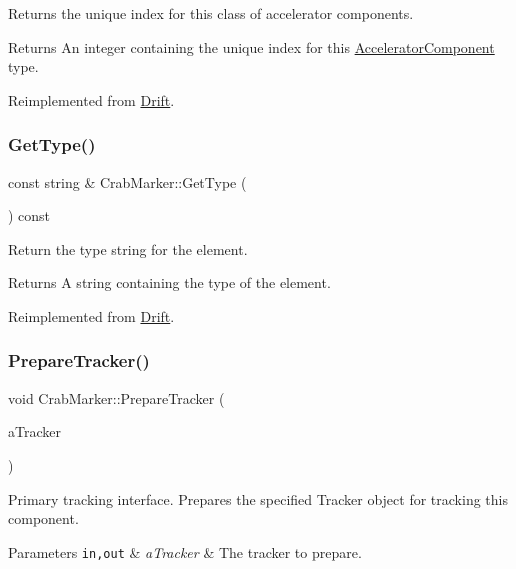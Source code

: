 Returns the unique index for this class of accelerator components. \begin{DoxyReturn}{Returns}
An integer containing the unique index for this \hyperlink{classAcceleratorComponent}{Accelerator\+Component} type. 
\end{DoxyReturn}


Reimplemented from \hyperlink{classDrift_a19bc19d48348912f8693e3ebbf9e92f2}{Drift}.

\mbox{\label{classCrabMarker_a45ab65449808d5072eb033858c2d961a}} 
\subsubsection{\texorpdfstring{Get\+Type()}{GetType()}}
{\footnotesize\ttfamily const string \& Crab\+Marker\+::\+Get\+Type (\begin{DoxyParamCaption}{ }\end{DoxyParamCaption}) const\hspace{0.3cm}{\ttfamily [virtual]}}

Return the type string for the element. \begin{DoxyReturn}{Returns}
A string containing the type of the element. 
\end{DoxyReturn}


Reimplemented from \hyperlink{classDrift_a9f5e7d0aafd8689a4420b3d5e7b6879e}{Drift}.

\mbox{\label{classCrabMarker_ab29822625603a198dc7623979ed1bb3b}} 
\subsubsection{\texorpdfstring{Prepare\+Tracker()}{PrepareTracker()}}
{\footnotesize\ttfamily void Crab\+Marker\+::\+Prepare\+Tracker (\begin{DoxyParamCaption}\item[{\hyperlink{classComponentTracker}{Component\+Tracker} \&}]{a\+Tracker }\end{DoxyParamCaption})\hspace{0.3cm}{\ttfamily [virtual]}}

Primary tracking interface. Prepares the specified Tracker object for tracking this component. 
\begin{DoxyParams}[1]{Parameters}
\mbox{\tt in,out}  & {\em a\+Tracker} & The tracker to prepare. \\
\hline
\end{DoxyParams}


